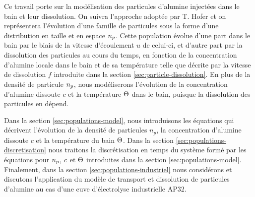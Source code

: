 Ce travail porte sur la modélisation des particules d'alumine
injectées dans le bain et leur dissolution. On suivra l'approche
adoptée par T. Hofer \cite{Hofer2011} et on représentera l'évolution
d'une famille de particules sous la forme d'une distribution en
taille et en espace $n_p$. Cette population évolue d'une part
dans le bain par le biais de la vitesse d'écoulement $u$ de celui-ci,
et d'autre part par la dissolution des particules au cours du temps,
en fonction de la concentration d'alumine locale dans le bain et de sa
température telle que décrite par la vitesse de dissolution $f$
introduite dans la section \ref{sec:particle-dissolution}. En plus de
la densité de particule $n_p$, nous modéliserons l'évolution
de la concentration d'alumine dissoute $c$ et la température
$\Theta$ dans le bain, puisque la dissolution des particules en
dépend.

Dans la section \ref{sec:populations-model}, nous introduisons les
équations qui décrivent l'évolution de la densité de particules $n_p$,
la concentration d'alumine dissoute $c$ et la température du bain
$\Theta$. Dans la section \ref{sec:populations-discretisation}
nous traitons la discrétisation en temps du système formé par les
équations pour $n_p$, $c$ et $\Theta$
introduites dans la section \ref{sec:populations-model}. Finalement,
dans la section \ref{sec:populations-industriel} nous considérons et
discutons l'application du modèle de transport et dissolution de
particules d'alumine au cas d'une cuve d'électrolyse industrielle
AP32.
